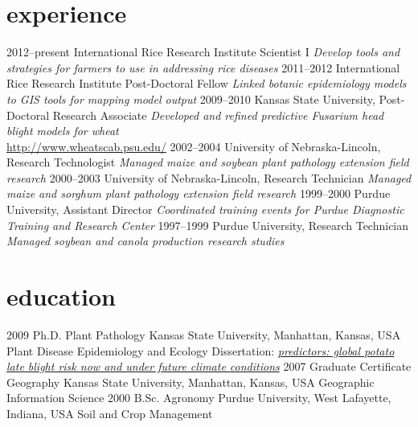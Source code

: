 \section*{experience}
\begin{entrylist}
  \entry
    {2012--present}
    {International Rice Research Institute }
    {Scientist I}
    {\emph{Develop tools and strategies for farmers to use in addressing rice diseases}}
  \entry
    {2011--2012}
    {International Rice Research Institute }
    {Post-Doctoral Fellow}
    {\emph{Linked botanic epidemiology models to GIS tools for mapping model output}}
  \entry
    {2009--2010}
    {Kansas State University, }
    {Post-Doctoral Research Associate}
    {\emph{Developed and refined predictive Fusarium head blight models for wheat}\\
    \href{http://www.wheatscab.psu.edu/}{http://www.wheatscab.psu.edu/}}
  \entry
   {2002--2004}
   {University of Nebraska-Lincoln, }
   {Research Technologist}
   {\emph{Managed maize and soybean plant pathology extension field research}}
  \entry
   {2000--2003}
   {University of Nebraska-Lincoln, }
   {Research Technician}
   {\emph{Managed maize and sorghum plant pathology extension field research}}
  \entry
   {1999--2000}
   {Purdue University, }
   {Assistant Director}
   {\emph{Coordinated training events for Purdue Diagnostic Training and Research Center}}
  \entry
   {1997--1999}
   {Purdue University, }
   {Research Technician}
   {\emph{Managed soybean and canola production research studies}}
\end{entrylist}

\section*{education}

\begin{entrylist}
  \entry
    {2009}
    {Ph.D. {\normalfont Plant Pathology}}
    {Kansas State University, Manhattan, Kansas, USA}
    {Plant Disease Epidemiology and Ecology}
  \entry
    {}
    {Dissertation: }
    {}
      {\emph{\href{https://krex.k-state.edu/dspace/handle/2097/2341?show=full}{predictors: global potato late blight risk now and under future climate conditions}}}
 \entry
    {2007}
    {Graduate Certificate {\normalfont Geography}}
    {Kansas State University, Manhattan, Kansas, USA}
    {Geographic Information Science}
  \entry
    {2000}
    {B.Sc. {\normalfont Agronomy}}
    {Purdue University, West Lafayette, Indiana, USA}
    {Soil and Crop Management}
\end{entrylist}
